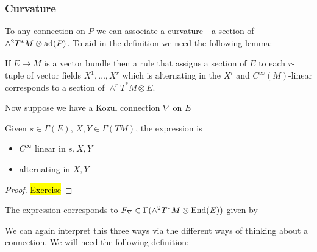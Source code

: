 \documentclass{article}
\begin{document}
\subsubsection{Curvature}

To any connection on $P$ we can associate a curvature - a section of $\wedge^2 T^\ast M \otimes \operatorname{ad}(P)$. To aid in the definition we need the following lemma:

\begin{lemma}
	If $E\to M$ is a vector bundle then a rule that assigns a section of $E$ to each $r$-tuple of vector fields $X^1, \dots, X^r$ which is alternating in the $X^i$ and $C^\infty(M)$-linear corresponds to a section of $\wedge^r T^\ast M \otimes E$. 
\end{lemma}

Now suppose we have a Kozul connection $\nabla$ on $E$

\begin{lemma}
	Given $s \in \Gamma(E), \, X,Y \in \Gamma(TM)$, the expression 
is 
\begin{itemize}
	\item $C^\infty$ linear in $s,X,Y$ 
	\item alternating in $X,Y$
\end{itemize}
\end{lemma}
\begin{proof}
	\hl{Exercise}
\end{proof}

\begin{corollary}
	The expression corresponds to $F_\nabla \in \Gamma(\wedge^2 T^\ast M \otimes \operatorname{End}(E))$ given by 
\end{corollary}

We can again interpret this three ways via the different ways of thinking about a connection. We will need the following definition:
\end{document}
